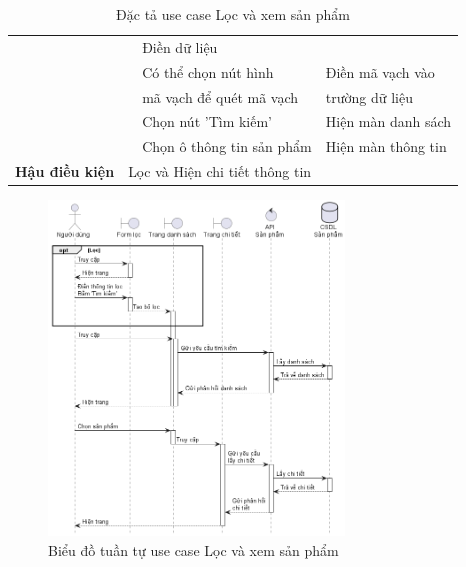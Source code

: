 \documentclass[../DoAn.tex]{subfiles}
\begin{document}
\begin{table}[H]
\begin{tabular}{|l|c|l|l|}
                                                &                                                                     & Điền dữ liệu                            &                                                 \\
                                                &                                                                     & Có thể chọn nút hình                    & Điền mã vạch vào                                \\
                                                &                                                                     & mã vạch để quét mã vạch                 & trường dữ liệu                                  \\ \cline{3-4}
                                                &                                                                     & Chọn nút 'Tìm kiếm'                     & Hiện màn danh sách                              \\ \cline{3-4}
                                                &                                                                     & Chọn ô thông tin sản phẩm               & Hiện màn thông tin                              \\ \hline
        \textbf{Hậu điều kiện}                  & \multicolumn{3}{l|}{Lọc và Hiện chi tiết thông tin}                                                                                                             \\ \hline
    \end{tabular}
    \caption{Đặc tả use case Lọc và xem sản phẩm}
    \label{table:uc-product-filter}
\end{table}
\begin{figure}[H]
    \centering
    \includegraphics[width=0.7\textwidth]{Hinhve/sequences/ProductFilter.png}
    \caption{Biểu đồ tuần tự use case Lọc và xem sản phẩm}
    \label{figure:sd-product-filter}
\end{figure}
\break
\end{document}
